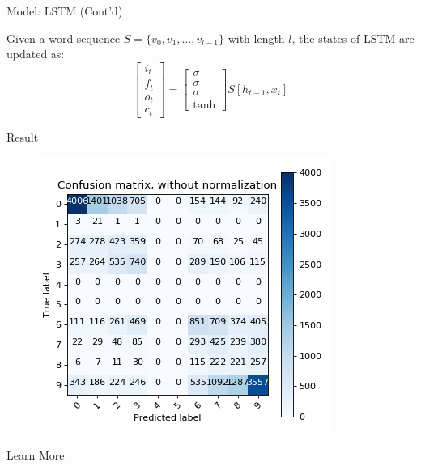 \documentclass[final]{beamer}
\newlength{\onecolwid}
\begin{document}
\begin{frame}[t]
\begin{columns}[t]
\begin{column}{\onecolwid}

\begin{block}{Model: LSTM (Cont'd)}

Given a word sequence $S=\{v_0,v_1,\ldots,v_{l-1}\}$ with length $l$, the states
of LSTM are updated as:
$$
\begin{bmatrix}
i_t\\f_t\\o_t\\c_t
\end{bmatrix} =
\begin{bmatrix}
\sigma\\\sigma\\\sigma\\\tanh
\end{bmatrix}
S[h_{t-1},x_t]
$$
\end{block}


\begin{block}{Result}

\begin{figure}
\includegraphics[width=0.8\linewidth]{figure/conf_matrix}
\end{figure}

\end{block}


\begin{block}{Learn More}


\end{block}
\end{column}
\end{columns}
\end{frame}
\end{document}
